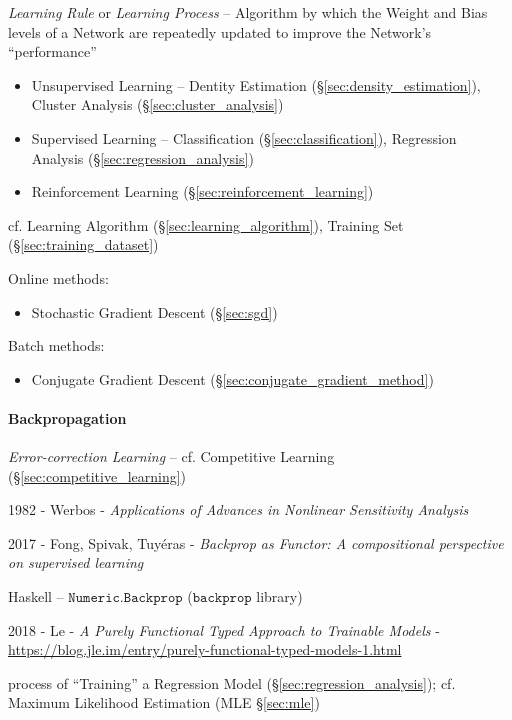 \emph{Learning Rule} or \emph{Learning Process} -- Algorithm by which the Weight
and Bias levels of a Network are repeatedly updated to improve the Network's
``performance''

\begin{itemize}
  \item Unsupervised Learning -- Dentity Estimation
    (\S\ref{sec:density_estimation}), Cluster Analysis
    (\S\ref{sec:cluster_analysis})
  \item Supervised Learning -- Classification (\S\ref{sec:classification}),
    Regression Analysis (\S\ref{sec:regression_analysis})
  \item Reinforcement Learning (\S\ref{sec:reinforcement_learning})
\end{itemize}

\fist cf. Learning Algorithm (\S\ref{sec:learning_algorithm}),
Training Set (\S\ref{sec:training_dataset})

Online methods:
\begin{itemize}
  \item Stochastic Gradient Descent (\S\ref{sec:sgd})
\end{itemize}

Batch methods:
\begin{itemize}
  \item Conjugate Gradient Descent (\S\ref{sec:conjugate_gradient_method})
\end{itemize}



\paragraph{Backpropagation}\label{sec:backpropagation}\hfill

\emph{Error-correction Learning} -- cf. Competitive Learning
(\S\ref{sec:competitive_learning})

1982 - Werbos -
\emph{Applications of Advances in Nonlinear Sensitivity Analysis}

2017 - Fong, Spivak, Tuy\'eras - \emph{Backprop as Functor: A compositional
  perspective on supervised learning}

Haskell -- $\mathtt{Numeric.Backprop}$ ($\mathtt{backprop}$ library)

2018 - Le - \emph{A Purely Functional Typed Approach to Trainable Models} -
\url{https://blog.jle.im/entry/purely-functional-typed-models-1.html}

process of ``Training'' a Regression Model (\S\ref{sec:regression_analysis});
cf. Maximum Likelihood Estimation (MLE \S\ref{sec:mle})

